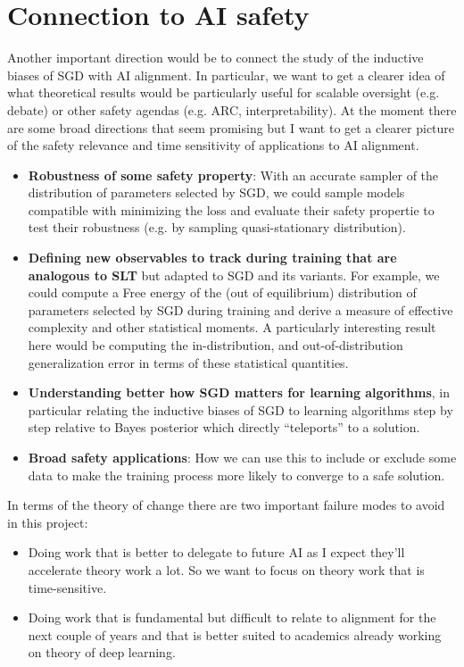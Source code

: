 \documentclass[11pt]{article}
\begin{document}
\section*{Connection to AI safety}
Another important direction would be to connect the study of the inductive biases of SGD with AI alignment. In  particular, we want to get a clearer idea of what theoretical results would be particularly useful for scalable oversight (e.g. debate) or other safety agendas (e.g. ARC, interpretability). At the moment there are some broad directions that seem promising but I want to get a clearer picture of the safety relevance and time sensitivity of applications to AI alignment.
\begin{itemize}
\item \textbf{Robustness of some safety property}: With an accurate sampler of the distribution of parameters selected by SGD, we could sample models compatible with minimizing the loss and evaluate their safety propertie to test their robustness (e.g. by sampling quasi-stationary distribution).
\item \textbf{Defining new observables to track during training that are analogous to SLT} but adapted to SGD and its variants. For example, we could compute a Free energy of the (out of equilibrium) distribution of parameters selected by SGD during training and derive a measure of effective complexity and other statistical moments. A particularly interesting result here would be computing the in-distribution, and out-of-distribution generalization error in terms of these statistical quantities.
\item \textbf{Understanding better how SGD matters for learning algorithms}, in particular relating the inductive biases of SGD to learning algorithms step by step relative to Bayes posterior which directly ``teleports'' to a solution.
\item \textbf{Broad safety applications}: How we can use this to include or exclude some data to make the training process more likely to converge to a safe solution.
\end{itemize}
In terms of the theory of change there are two important failure modes to avoid in this project:
\begin{itemize}
\item Doing work that is better to delegate to future AI as I expect they'll accelerate theory work a lot. So we want to focus on theory work that is time-sensitive.
\item Doing work that is fundamental but difficult to relate to alignment for the next couple of years and that is better suited to academics already working on theory of deep learning.
\end{itemize}
\begin{comment}
\section*{Connection to AI safety}
TODO: explain what are the most promising link to safety. I already mentioned some of that in the motivation section but should be spelled out in greater details.
\end{comment}
\end{document}
